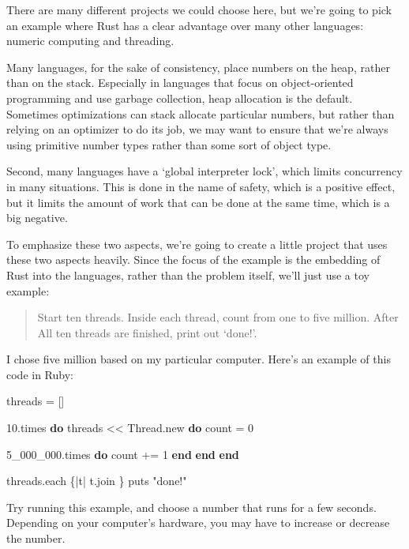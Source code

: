 \documentclass[a4paper,]{book}
\newenvironment{Shaded}{\begin{snugshade}}{\end{snugshade}}
\newcommand{\KeywordTok}[1]{\textcolor[rgb]{0.13,0.29,0.53}{\textbf{{#1}}}}
\newcommand{\DataTypeTok}[1]{\textcolor[rgb]{0.13,0.29,0.53}{{#1}}}
\newcommand{\DecValTok}[1]{\textcolor[rgb]{0.00,0.00,0.81}{{#1}}}
\newcommand{\StringTok}[1]{\textcolor[rgb]{0.31,0.60,0.02}{{#1}}}
\newcommand{\NormalTok}[1]{{#1}}
\begin{document}
There are many different projects we could choose here, but we're going
to pick an example where Rust has a clear advantage over many other
languages: numeric computing and threading.

Many languages, for the sake of consistency, place numbers on the heap,
rather than on the stack. Especially in languages that focus on
object-oriented programming and use garbage collection, heap allocation
is the default. Sometimes optimizations can stack allocate particular
numbers, but rather than relying on an optimizer to do its job, we may
want to ensure that we're always using primitive number types rather
than some sort of object type.

Second, many languages have a `global interpreter lock', which limits
concurrency in many situations. This is done in the name of safety,
which is a positive effect, but it limits the amount of work that can be
done at the same time, which is a big negative.

To emphasize these two aspects, we're going to create a little project
that uses these two aspects heavily. Since the focus of the example is
the embedding of Rust into the languages, rather than the problem
itself, we'll just use a toy example:

\begin{quote}
Start ten threads. Inside each thread, count from one to five million.
After All ten threads are finished, print out `done!'.
\end{quote}

I chose five million based on my particular computer. Here's an example
of this code in Ruby:

\begin{Shaded}
\begin{Highlighting}[]
\NormalTok{threads = []}

\DecValTok{10}\NormalTok{.times }\KeywordTok{do}
  \NormalTok{threads << }\DataTypeTok{Thread}\NormalTok{.new }\KeywordTok{do}
    \NormalTok{count = }\DecValTok{0}

    \DecValTok{5_000_000}\NormalTok{.times }\KeywordTok{do}
      \NormalTok{count += }\DecValTok{1}
    \KeywordTok{end}
  \KeywordTok{end}
\KeywordTok{end}

\NormalTok{threads.each \{|t| t.join \}}
\NormalTok{puts }\StringTok{"done!"}
\end{Highlighting}
\end{Shaded}

Try running this example, and choose a number that runs for a few
seconds. Depending on your computer's hardware, you may have to increase
or decrease the number.
\end{document}
